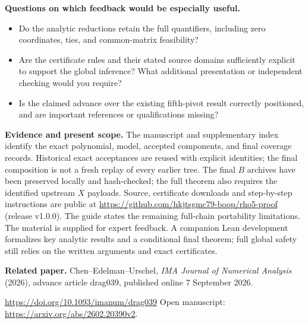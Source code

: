 \documentclass[10pt]{article}
\begin{document}
\textbf{Questions on which feedback would be especially useful.}
\begin{itemize}
\setlength{\itemsep}{2pt}
\item Do the analytic reductions retain the full quantifiers,
including zero coordinates, ties, and common-matrix feasibility?
\item Are the certificate rules and their stated source domains
sufficiently explicit to support the global inference?
What additional presentation or independent checking would you require?
\item Is the claimed advance over the existing fifth-pivot result
correctly positioned, and are important references or qualifications missing?
\end{itemize}

\textbf{Evidence and present scope.} The manuscript and supplementary index identify the exact
polynomial, model, accepted components, and final coverage records.
Historical exact acceptances are reused with explicit identities;
the final composition is not a fresh replay of every earlier tree.
The final \(B\) archives have been preserved locally and hash-checked;
the full theorem also requires the identified upstream \(X\) payloads.
Source, certificate downloads and step-by-step instructions are public at
\url{https://github.com/hkjtsgmc79-boop/rho5-proof} (release v1.0.0).
The guide states the remaining full-chain portability limitations.
The material is supplied for expert feedback. A companion Lean development
formalizes key analytic results and a conditional final theorem; full
global safety still relies on the written arguments and exact certificates.

\textbf{Related paper.} Chen--Edelman--Urschel,
\textit{IMA Journal of Numerical Analysis} (2026), advance article drag039,
published online 7 September 2026.\par
\url{https://doi.org/10.1093/imanum/drag039}\quad
Open manuscript: \url{https://arxiv.org/abs/2602.20390v2}.
\end{document}
